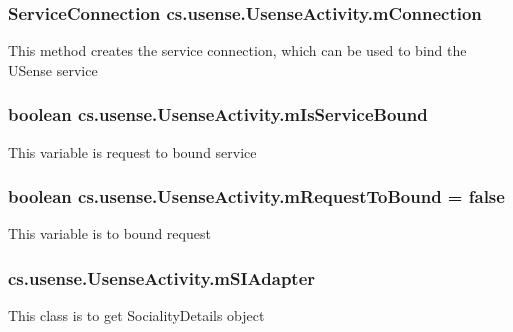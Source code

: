 \subsubsection[{m\+Connection}]{\setlength{\rightskip}{0pt plus 5cm}Service\+Connection cs.\+usense.\+Usense\+Activity.\+m\+Connection\hspace{0.3cm}{\ttfamily [private]}}\label{classcs_1_1usense_1_1_usense_activity_ae27ad214010eea791ca67b2eff246e56}
This method creates the service connection, which can be used to bind the U\+Sense service \hypertarget{classcs_1_1usense_1_1_usense_activity_afe23746678829a04aa6c82f7d8d6fa71}{}
\subsubsection[{m\+Is\+Service\+Bound}]{\setlength{\rightskip}{0pt plus 5cm}boolean cs.\+usense.\+Usense\+Activity.\+m\+Is\+Service\+Bound\hspace{0.3cm}{\ttfamily [private]}}\label{classcs_1_1usense_1_1_usense_activity_afe23746678829a04aa6c82f7d8d6fa71}
This variable is request to bound service \hypertarget{classcs_1_1usense_1_1_usense_activity_a752b7a320a71b54860083dcf3fa53ea2}{}
\subsubsection[{m\+Request\+To\+Bound}]{\setlength{\rightskip}{0pt plus 5cm}boolean cs.\+usense.\+Usense\+Activity.\+m\+Request\+To\+Bound = false\hspace{0.3cm}{\ttfamily [private]}}\label{classcs_1_1usense_1_1_usense_activity_a752b7a320a71b54860083dcf3fa53ea2}
This variable is to bound request \hypertarget{classcs_1_1usense_1_1_usense_activity_a079434ad4693107f055651047a0dc9c8}{}
\subsubsection[{m\+S\+I\+Adapter}]{ cs.\+usense.\+Usense\+Activity.\+m\+S\+I\+Adapter\hspace{0.3cm}{\ttfamily [private]}}\label{classcs_1_1usense_1_1_usense_activity_a079434ad4693107f055651047a0dc9c8}
This class is to get Sociality\+Details object \hypertarget{classcs_1_1usense_1_1_usense_activity_aadee7e5d8c283dfae9005d3e2fd4fcd7}{}
